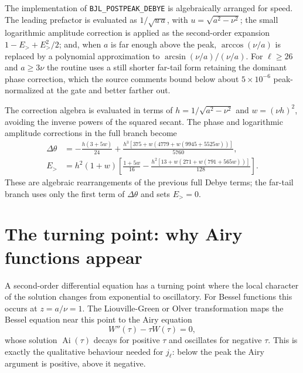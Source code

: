 \documentclass[11pt,a4paper]{article}
\newcommand{\Ai}{\operatorname{Ai}}
\newcommand{\code}[1]{\texttt{#1}}
\begin{document}
The implementation of \code{BJL\_POSTPEAK\_DEBYE} is algebraically arranged for speed.  The leading prefactor is evaluated as $1/\sqrt{u\,a}$, with $u=\sqrt{a^2-\nu^2}$; the small logarithmic amplitude correction is applied as the second-order expansion $1-E_{>}+E_{>}^2/2$; and, when $a$ is far enough above the peak, $\arccos(\nu/a)$ is replaced by a polynomial approximation to $\arcsin(\nu/a)/(\nu/a)$.  For $\ell\ge26$ and $a\ge3\nu$ the routine uses a still shorter far-tail form retaining the dominant phase correction, which the source comments bound below about $5\times10^{-6}$ peak-normalized at the gate and better farther out.

The correction algebra is evaluated in terms of
$h=1/\sqrt{a^2-\nu^2}$ and $w=(\nu h)^2$, avoiding the inverse
powers of the squared secant.  The phase and logarithmic amplitude corrections
in the full branch become
\begin{align}
 \Delta\theta &=-\frac{h(3+5w)}{24}
 +\frac{h^3[375+w(4779+w(9945+5525w))]}{5760},\\
 E_>&=h^2(1+w)\left[
 \frac{1+5w}{16}
 -\frac{h^2[13+w(271+w(791+565w))]}{128}\right].
\end{align}
These are algebraic rearrangements of the previous full Debye terms;
the far-tail branch uses only the first term of $\Delta\theta$ and sets
$E_>=0$.

\section{The turning point: why Airy functions appear}

A second-order differential equation has a turning point where the local character of the solution changes from exponential to oscillatory.  For Bessel functions this occurs at $z=a/\nu=1$.  The Liouville-Green or Olver transformation maps the Bessel equation near this point to the Airy equation
\begin{equation}
  W''(\tau)-\tau W(\tau)=0,
\end{equation}
whose solution $\Ai(\tau)$ decays for positive $\tau$ and oscillates for negative $\tau$.  This is exactly the qualitative behaviour needed for $j_\ell$: below the peak the Airy argument is positive, above it negative.
\end{document}

